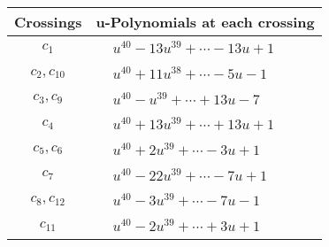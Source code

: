 \documentclass[1p]{elsarticle_modified}
\theoremstyle{definition}
\begin{document}
\begin{tabular}{m{50pt}|m{274pt}}
Crossings & \hspace{64pt}u-Polynomials at each crossing \\
\hline $$\begin{aligned}c_{1}\end{aligned}$$&$\begin{aligned}
&u^{40}-13 u^{39}+\cdots-13 u+1
\end{aligned}$\\
\hline $$\begin{aligned}c_{2},c_{10}\end{aligned}$$&$\begin{aligned}
&u^{40}+11 u^{38}+\cdots-5 u-1
\end{aligned}$\\
\hline $$\begin{aligned}c_{3},c_{9}\end{aligned}$$&$\begin{aligned}
&u^{40}- u^{39}+\cdots+13 u-7
\end{aligned}$\\
\hline $$\begin{aligned}c_{4}\end{aligned}$$&$\begin{aligned}
&u^{40}+13 u^{39}+\cdots+13 u+1
\end{aligned}$\\
\hline $$\begin{aligned}c_{5},c_{6}\end{aligned}$$&$\begin{aligned}
&u^{40}+2 u^{39}+\cdots-3 u+1
\end{aligned}$\\
\hline $$\begin{aligned}c_{7}\end{aligned}$$&$\begin{aligned}
&u^{40}-22 u^{39}+\cdots-7 u+1
\end{aligned}$\\
\hline $$\begin{aligned}c_{8},c_{12}\end{aligned}$$&$\begin{aligned}
&u^{40}-3 u^{39}+\cdots-7 u-1
\end{aligned}$\\
\hline $$\begin{aligned}c_{11}\end{aligned}$$&$\begin{aligned}
&u^{40}-2 u^{39}+\cdots+3 u+1
\end{aligned}$\\
\hline
\end{tabular}\\~\\
\end{document}
